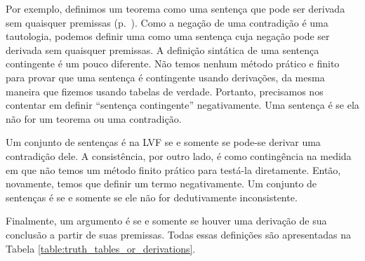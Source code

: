 Por exemplo, definimos um teorema como uma sentença que pode ser derivada sem quaisquer premissas (p.~\pageref{def:syntactic_tautology_in_sl}). Como a negação de uma contradição é uma tautologia, podemos definir uma  \label{def:syntactic_contradiction_in_sl} como uma sentença cuja negação pode ser derivada sem quaisquer premissas. A definição sintática de uma sentença contingente é um pouco diferente. Não temos nenhum método prático e finito para provar que uma sentença é contingente usando derivações, da mesma maneira que fizemos usando tabelas de verdade. Portanto, precisamos nos contentar em definir ``sentença contingente'' negativamente. Uma sentença é  \label{def:syntactically_contingent_in_sl} se ela  não for um teorema ou uma contradição. 
 

Um  conjunto de sentenças é  na LVF \label{def:syntactically_inconsistent_ in_sl}  se e somente se pode-se derivar uma contradição dele. A consistência, por outro lado, é como contingência na medida em que não temos um método finito prático para testá-la diretamente. Então, novamente, temos que definir um termo negativamente. Um  conjunto de sentenças é  \label{def:syntactically consistent in SL} se e somente se ele não for dedutivamente inconsistente.
    
Finalmente, um argumento é   \label{def:syntactically_valid_in_SL}se e somente se houver uma derivação de sua conclusão a partir de suas premissas. Todas essas definições são apresentadas na Tabela \ref{table:truth_tables_or_derivations}.

